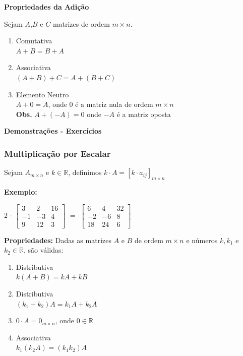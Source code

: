 \documentclass[oneside,a4paper,12pt]{article}
\begin{document}
\textbf{Propriedades da Adição}

Sejam $A$,$B$ e $C$ matrizes de ordem $m \times n$.
\begin{enumerate}
	\item Comutativa \\ $A+B=B+A$ 
	\item Associativa \\$(A+B)+C=A+(B+C)$ 
	\item Elemento Neutro \\ $A+0=A$, onde $0$ é a matriz nula de ordem $m \times n$ \\ \textbf{Obs. } $A+(-A)=0$ onde $-A$ é a matriz oposta
\end{enumerate}

\textbf{Demonstrações - Exercícios}

\subsubsection{Multiplicação por Escalar}

Sejam $A_{m \times n}$ e $k \in \mathbb{R}$, definimos $k \cdot A = [k \cdot a_{ij}]_{m \times n}$

\textbf{Exemplo: }

$2$ $\cdot$
$
\left[
\begin{array}{ccc}
3	&	2	&	16	\\
-1	&	-3	&	4	\\
9	&	12	&	3
\end{array}
\right]
$	
 $=$
$
\left[
\begin{array}{ccc}
6	&	4	&	32	\\
-2	&	-6	&	8	\\
18	&	24	&	6
\end{array}
\right]
$

\textbf{Propriedades: } Dadas as matrizes $A$ e $B$ de ordem $m \times n$ e números $k, k_1$ e $k_2 \in \mathbb{R}$, são válidas:
\begin{enumerate}
	\item Distributiva \\ $k(A+B)=kA+kB$
	\item Distributiva \\ $(k_1 + k_2)A = k_{1}A+k_{2}A$
	\item $0 \cdot A = 0_{m \times n}$, onde $0 \in \mathbb{R}$
	\item Associativa \\ $k_1(k_{2}A) = (k_{1}k_{2})A$
\end{enumerate}
\end{document}
